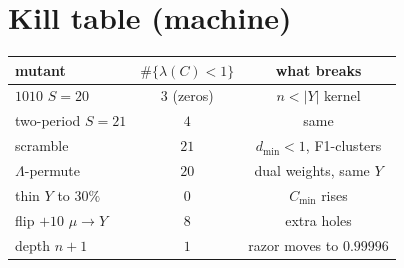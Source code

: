 \documentclass[11pt]{article}
\theoremstyle{remark}
\begin{document}
\section*{Kill table (machine)}

\begin{center}
\begin{tabular}{@{}lcc@{}}
\toprule
mutant & $\#\{\lambda(C)<1\}$ & what breaks \\
\midrule
$1010$ $S=20$ & $3$ (zeros) & $n<|Y|$ kernel \\
two-period $S=21$ & $4$ & same \\
scramble & $21$ & $d_{\min}<1$, F1-clusters \\
$\Lambda$-permute & $20$ & dual weights, same $Y$ \\
thin $Y$ to $30\%$ & $0$ & $C_{\min}$ rises \\
flip $+10$ $\mu\to Y$ & $8$ & extra holes \\
depth $n+1$ & $1$ & razor moves to $0.99996$ \\
\bottomrule
\end{tabular}
\end{center}
\end{document}
